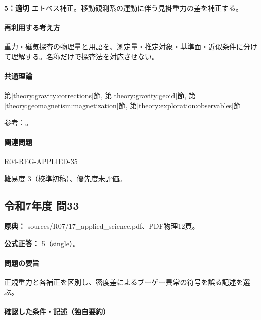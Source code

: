 \noindent\textbf{5：適切} エトベス補正。移動観測系の運動に伴う見掛重力の差を補正する。\par

\paragraph{再利用する考え方} 重力・磁気探査の物理量と用語を、測定量・推定対象・基準面・近似条件に分けて理解する。名称だけで探査法を対応させない。

\paragraph{共通理論} \hyperref[theory:gravity:corrections]{第\ref*{theory:gravity:corrections}節}, \hyperref[theory:gravity:geoid]{第\ref*{theory:gravity:geoid}節}, \hyperref[theory:geomagnetism:magnetization]{第\ref*{theory:geomagnetism:magnetization}節}, \hyperref[theory:exploration:observables]{第\ref*{theory:exploration:observables}節}

\par 参考：\cite{gsi_gravity_definitions,kanaya_okuma2011,sato_lei2009_ae}。

\paragraph{関連問題} \hyperref[q:r04-reg-applied-35]{R04-REG-APPLIED-35}

\par 難易度 3（校準初稿）、優先度未評価。

\subsection{令和7年度 問33}
\label{q:r07-reg-applied-33}

\noindent\textbf{原典：} sources/R07/17\_applied\_science.pdf、PDF物理12頁。

\textbf{公式正答：} 5（single）。

\paragraph{問題の要旨} 正規重力と各補正を区別し、密度差によるブーゲー異常の符号を誤る記述を選ぶ。

\paragraph{確認した条件・記述（独自要約）}\mbox{}\par

